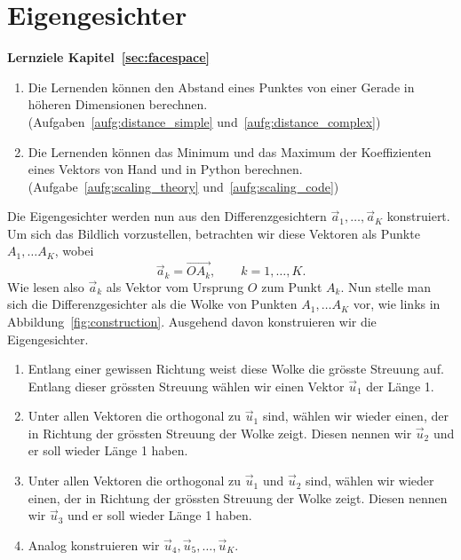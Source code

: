 \section{Eigengesichter} \label{sec:eigenfaces}
\begin{tcolorbox}
	\centerline{\textbf{Lernziele Kapitel~\ref{sec:facespace}}}
	\begin{enumerate}[leftmargin=*,label=\thesection.\arabic*]
		\item \label{item:distance} Die Lernenden können den Abstand eines Punktes von einer Gerade in höheren Dimensionen berechnen.\\
		(Aufgaben~\ref{aufg:distance_simple} und~\ref{aufg:distance_complex})
		\item \label{item:scaling} Die Lernenden können das Minimum und das Maximum der Koeffizienten eines Vektors von Hand und in Python berechnen.\\
		(Aufgabe~\ref{aufg:scaling_theory} und~\ref{aufg:scaling_code})
	\end{enumerate}
\end{tcolorbox}
Die Eigengesichter werden nun aus den Differenzgesichtern $\vec a_1,\ldots,\vec a_K$ konstruiert.
Um sich das Bildlich vorzustellen, betrachten wir diese Vektoren als Punkte $A_1,\ldots A_K$, wobei
\begin{equation*}
	\vec{a}_k=\overrightarrow{OA_k},\qquad k=1,\ldots,K.
\end{equation*}
Wie lesen also $\vec{a}_k$ als Vektor vom Ursprung $O$ zum Punkt $A_k$.
Nun stelle man sich die Differenzgesichter als die \glqq{}Wolke\grqq{} von Punkten $A_1,\ldots A_K$ vor, wie links in Abbildung~\ref{fig:construction}.
Ausgehend davon konstruieren wir die Eigengesichter.
\begin{enumerate}[leftmargin=2cm, label=Schritt \arabic*]
	\item Entlang einer gewissen Richtung weist diese Wolke die grösste Streuung auf.
	Entlang dieser grössten Streuung wählen wir einen Vektor $\vec u_1$ der Länge 1.
	\item \label{item:u2} Unter allen Vektoren die orthogonal zu $\vec u_1$ sind, wählen wir wieder einen, der in Richtung der grössten Streuung der Wolke zeigt.
	Diesen nennen wir $\vec u_2$ und er soll wieder Länge 1 haben.
	\item Unter allen Vektoren die orthogonal zu $\vec u_1$ und $\vec u_2$ sind, wählen wir wieder einen, der in Richtung der grössten Streuung der Wolke zeigt.
	Diesen nennen wir $\vec u_3$ und er soll wieder Länge 1 haben.
	\item Analog konstruieren wir $\vec u_4,\vec u_5,\ldots,\vec u_K$.
\end{enumerate}
